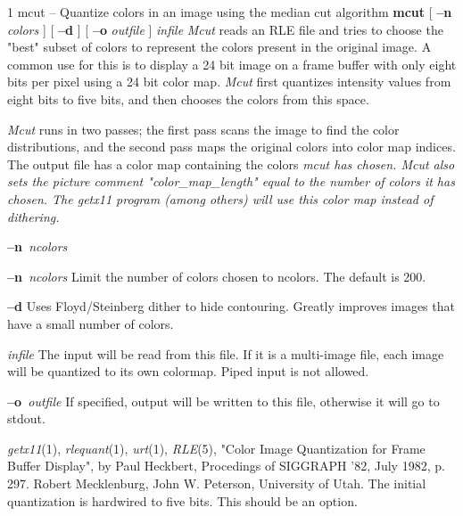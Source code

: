 %
%
%
 1
mcut -- Quantize colors in an image using the median cut algorithm
{\bf mcut}
[
{\bf --n}
{\it colors}
]
[
{\bf --d}
] [
{\bf --o}
{\it outfile}
]
{\it infile}
{\it Mcut}
reads an RLE file and tries to choose the "best" subset of colors to
represent the colors present in the original image.  A common use for this
is to display a 24 bit image on a frame buffer with only eight bits per
pixel using a 24 bit color map.  
{\it Mcut}
first quantizes intensity values
from eight bits to five bits, and then chooses the colors from this space.

{\it Mcut}
runs in two passes; the first pass scans the image to find the color
distributions, and the second pass maps the original colors into color
map indices.  The output file has a color map containing the colors
%
\it mcut \rm%
has chosen.  %
\it Mcut \rm%
also sets the picture comment
"color\_map\_length" equal to the number of colors it has chosen.  The
{\it getx11}
program (among others) will use this color map instead of dithering.
\begin{TPlist}{{\bf --n}{\it \ ncolors}
}
\item[{{\bf --n}{\it \ ncolors}
}]
Limit the number of colors chosen to ncolors.  The default is 200.
\item[{{\bf --d}}]
Uses Floyd/Steinberg dither to hide contouring.  Greatly improves images
that have a small number of colors.
\item[{{\it infile}}]
The input will be read from this file.  If it is a multi-image file,
each image will be quantized to its own colormap.
Piped input is not allowed.  
\item[{{\bf --o}{\it \ outfile}
}]
If specified, output will be written to this file, otherwise it will
go to stdout.
\end{TPlist}
{\it getx11}{\rm (1),}
{\it rlequant}{\rm (1),}
{\it urt}{\rm (1),}
{\it RLE}{\rm (5),}
\nwl
"Color Image Quantization for Frame Buffer Display", by Paul Heckbert,
Procedings of SIGGRAPH '82, July 1982, p. 297.
Robert Mecklenburg, John W. Peterson, University of Utah.
The initial quantization is hardwired to five bits.  This should be an
option.

\newpage


